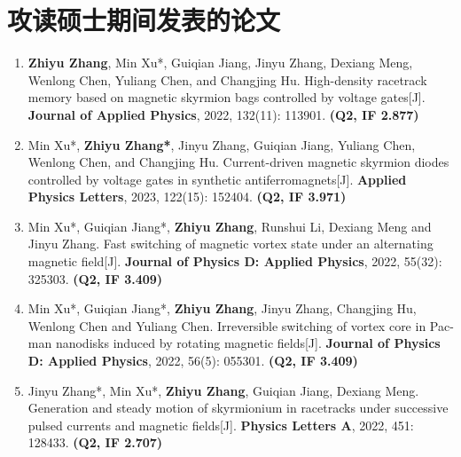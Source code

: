 \chapter*{攻读硕士期间发表的论文}
\begin{enumerate}[leftmargin=4ex, labelsep=1.5ex, itemsep=1ex, topsep=1ex,partopsep=1ex,parsep=0pt]
    \renewcommand{\labelenumi}{[\theenumi]}
    \item \textbf{Zhiyu Zhang}, Min Xu*, Guiqian Jiang, Jinyu Zhang, Dexiang Meng, Wenlong Chen, Yuliang Chen, and Changjing Hu.
    High-density racetrack memory based on magnetic skyrmion bags controlled by voltage gates[J]. 
    \textbf{Journal of Applied Physics}, 2022, 132(11): 113901. \textbf{(Q2, IF 2.877)}
    \item Min Xu*, \textbf{Zhiyu Zhang*}, Jinyu Zhang, Guiqian Jiang, Yuliang Chen, Wenlong Chen, and Changjing Hu.
    Current-driven magnetic skyrmion diodes controlled by voltage gates in synthetic antiferromagnets[J]. 
    \textbf{Applied Physics Letters}, 2023, 122(15): 152404. \textbf{(Q2, IF 3.971)}
    \item Min Xu*, Guiqian Jiang*, \textbf{Zhiyu Zhang}, Runshui Li, Dexiang Meng and Jinyu Zhang.
    Fast switching of magnetic vortex state under an alternating magnetic field[J]. 
    \textbf{Journal of Physics D: Applied Physics}, 2022, 55(32): 325303. \textbf{(Q2, IF 3.409)}
    \item Min Xu*, Guiqian Jiang*, \textbf{Zhiyu Zhang}, Jinyu Zhang, Changjing Hu, Wenlong Chen and Yuliang Chen.
    Irreversible switching of vortex core in Pac-man nanodisks induced by rotating magnetic fields[J]. 
    \textbf{Journal of Physics D: Applied Physics}, 2022, 56(5): 055301. \textbf{(Q2, IF 3.409)}
    \item Jinyu Zhang*, Min Xu*, \textbf{Zhiyu Zhang}, Guiqian Jiang, Dexiang Meng.
    Generation and steady motion of skyrmionium in racetracks under successive pulsed currents and magnetic fields[J]. 
    \textbf{Physics Letters A}, 2022, 451: 128433. \textbf{(Q2, IF 2.707)}
\end{enumerate}